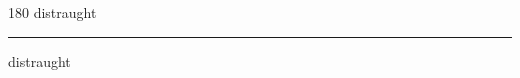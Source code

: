 
\begin{frame}
\begin{center}
\begin{turn}{180}
{\fontsize{2.5cm}{1em}\selectfont distraught}
\end{turn}
\vspace{1em}\par  
\hrule
\vspace{1em}\par  
{\fontsize{2.5cm}{1em}\selectfont distraught}
\end{center}
\end{frame}
